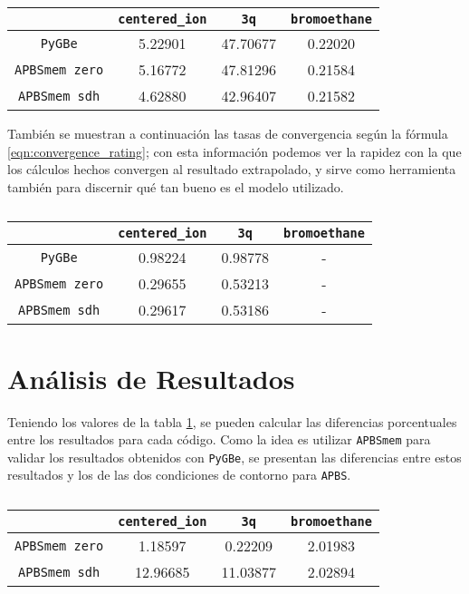 \documentclass[12pt, oneside, numbers, spanish]{ezthesis}
\numberwithin{equation}{section}
\begin{document}
\begin{table}[H]
	\centering
	\caption{}
	\def\arraystretch{0.8}
	\begin{tabular}{|c|ccc|}\hline
		 & \texttt{centered\_ion} & \texttt{3q} & \texttt{bromoethane} \\ \hline
		\texttt{PyGBe} & 5.22901 & 47.70677 & 0.22020 \\ \hline
		\texttt{APBSmem zero} & 5.16772 & 47.81296 & 0.21584 \\ \hline
		\texttt{APBSmem sdh} & 4.62880 & 42.96407 & 0.21582 \\ \hline
	\end{tabular}\label{table:Rich_extrapolation}
\end{table}

\noindent
También se muestran a continuación las tasas de convergencia según la fórmula \ref{eqn:convergence_rating}; con esta información podemos ver la rapidez con la que los cálculos hechos convergen al resultado extrapolado, y sirve como herramienta también para discernir qué tan bueno es el modelo utilizado.

\begin{table}[H]
	\centering
	\caption{}
	\def\arraystretch{0.8}
	\begin{tabular}{|c|ccc|}\hline
		& \texttt{centered\_ion} & \texttt{3q} & \texttt{bromoethane} \\ \hline
		\texttt{PyGBe} & 0.98224 & 0.98778 & - \\ \hline
		\texttt{APBSmem zero} & 0.29655 & 0.53213 & - \\ \hline
		\texttt{APBSmem sdh} & 0.29617 & 0.53186 & - \\ \hline
	\end{tabular}\label{table:Convergence_ratings}
\end{table}

\section{Análisis de Resultados}\label{Sec:analisis_resultados}

Teniendo los valores de la tabla \ref{table:Rich_extrapolation}, se pueden calcular las diferencias porcentuales entre los resultados para cada código. Como la idea es utilizar \texttt{APBSmem} para validar los resultados obtenidos con \texttt{PyGBe}, se presentan las diferencias entre estos resultados y los de las dos condiciones de contorno para \texttt{APBS}.

\begin{table}[H]
	\centering
	\caption{}
	\def\arraystretch{0.8}
	\begin{tabular}{|c|ccc|}\hline
		& \texttt{centered\_ion} & \texttt{3q} & \texttt{bromoethane} \\ \hline
		\texttt{APBSmem zero} & 1.18597 & 0.22209 & 2.01983 \\ \hline
		\texttt{APBSmem sdh} & 12.96685 & 11.03877 & 2.02894 \\ \hline
	\end{tabular}\label{table:Percent_Error}
\end{table}
\end{document}
